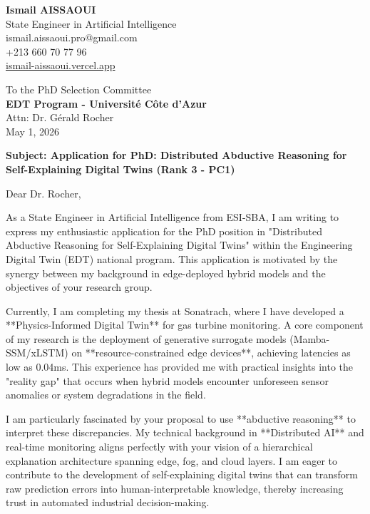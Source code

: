 \documentclass[a4paper,12pt]{article}
\begin{document}
\begin{flushleft}
    \textbf{Ismail AISSAOUI} \\
    State Engineer in Artificial Intelligence \\
    ismail.aissaoui.pro@gmail.com \\
    +213 660 70 77 96 \\
    \href{https://ismail-aissaoui.vercel.app}{ismail-aissaoui.vercel.app}
\end{flushleft}

\begin{flushright}
    To the PhD Selection Committee \\
    \textbf{EDT Program - Université Côte d’Azur} \\
    Attn: Dr. Gérald Rocher \\
    \medskip
    May 1, 2026
\end{flushright}

\bigskip

\noindent \textbf{Subject: Application for PhD: Distributed Abductive Reasoning for Self-Explaining Digital Twins (Rank 3 - PC1)}

\bigskip

Dear Dr. Rocher,

As a State Engineer in Artificial Intelligence from ESI-SBA, I am writing to express my enthusiastic application for the PhD position in "Distributed Abductive Reasoning for Self-Explaining Digital Twins" within the Engineering Digital Twin (EDT) national program. This application is motivated by the synergy between my background in edge-deployed hybrid models and the objectives of your research group.

Currently, I am completing my thesis at Sonatrach, where I have developed a **Physics-Informed Digital Twin** for gas turbine monitoring. A core component of my research is the deployment of generative surrogate models (Mamba-SSM/xLSTM) on **resource-constrained edge devices**, achieving latencies as low as 0.04ms. This experience has provided me with practical insights into the "reality gap" that occurs when hybrid models encounter unforeseen sensor anomalies or system degradations in the field.

I am particularly fascinated by your proposal to use **abductive reasoning** to interpret these discrepancies. My technical background in **Distributed AI** and real-time monitoring aligns perfectly with your vision of a hierarchical explanation architecture spanning edge, fog, and cloud layers. I am eager to contribute to the development of self-explaining digital twins that can transform raw prediction errors into human-interpretable knowledge, thereby increasing trust in automated industrial decision-making.
\end{document}
